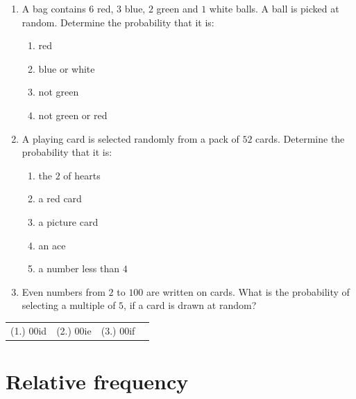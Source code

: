 \begin{exercises}{}
{
  \begin{enumerate}[itemsep=5pt, label=\textbf{\arabic*}. ]
  \item 
A bag contains $6$ red, $3$ blue, $2$ green and $1$ white
    balls. A ball is picked at random. Determine the probability that it
    is:
    \begin{enumerate}[noitemsep, label=\textbf{(\alph*)} ]
    \item red
    \item blue or white
    \item not green
    \item not green or red
    \end{enumerate}
  \item 
A playing card is selected randomly from a pack of $52$
    cards. Determine the probability that it is:
    \begin{enumerate}[noitemsep, label=\textbf{(\alph*)} ]
    \item the $2$ of hearts
    \item a red card
    \item a picture card
    \item an ace
    \item a number less than $4$
    \end{enumerate}
\item Even numbers from $2$ to $100$ are written on cards. 
  What is
    the probability of selecting a multiple of $5$, if a card is drawn
    at random?

\end{enumerate}
\practiceinfo

  \begin{tabularx}{\textwidth}{XXXX}
    (1.) 00id& (2.) 00ie& (3.) 00if\\
  \end{tabularx}
}
\end{exercises}

\section{Relative frequency}


